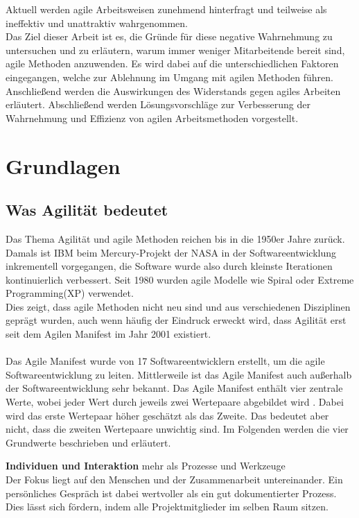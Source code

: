 \documentclass[ngerman]{seminarvorlage}
\begin{document}
Aktuell werden agile Arbeitsweisen zunehmend hinterfragt und teilweise als ineffektiv und unattraktiv wahrgenommen.\\
Das Ziel dieser Arbeit ist es, die Gründe für diese negative Wahrnehmung zu untersuchen und zu erläutern, warum immer weniger Mitarbeitende bereit sind, agile Methoden anzuwenden. Es wird dabei auf die unterschiedlichen Faktoren eingegangen, welche zur Ablehnung im Umgang mit agilen Methoden führen. Anschließend werden die Auswirkungen des Widerstands gegen agiles Arbeiten erläutert. Abschließend werden Lösungsvorschläge zur Verbesserung der Wahrnehmung und Effizienz von agilen Arbeitsmethoden vorgestellt.



\section{Grundlagen}
\subsection{Was Agilität bedeutet}
Das Thema Agilität und agile Methoden reichen bis in die 1950er Jahre zurück. Damals ist IBM beim Mercury-Projekt der NASA in der Softwareentwicklung inkrementell vorgegangen, die Software wurde also durch kleinste Iterationen kontinuierlich verbessert. Seit 1980 wurden agile Modelle wie Spiral oder Extreme Programming(XP) verwendet.\\
Dies zeigt, dass agile Methoden nicht neu sind und aus verschiedenen Disziplinen geprägt wurden, auch wenn häufig der Eindruck erweckt wird, dass Agilität erst seit dem Agilen Manifest im Jahr 2001 existiert.\\\\%
Das Agile Manifest wurde von 17 Softwareentwicklern erstellt, um die agile Softwareentwicklung zu leiten. Mittlerweile ist das Agile Manifest auch außerhalb der Softwareentwicklung sehr bekannt.
Das Agile Manifest enthält vier zentrale Werte, wobei jeder Wert durch jeweils zwei Wertepaare abgebildet wird . Dabei wird das erste Wertepaar höher geschätzt als das Zweite. Das bedeutet aber nicht, dass die zweiten Wertepaare unwichtig sind. Im Folgenden werden die vier Grundwerte beschrieben und erläutert.

\textbf{Individuen und Interaktion} mehr als Prozesse und Werkzeuge\\
Der Fokus liegt auf den Menschen und der Zusammenarbeit untereinander. Ein persönliches Gespräch ist dabei wertvoller als ein gut dokumentierter Prozess. Dies lässt sich fördern, indem alle Projektmitglieder im selben Raum sitzen.
\end{document}
